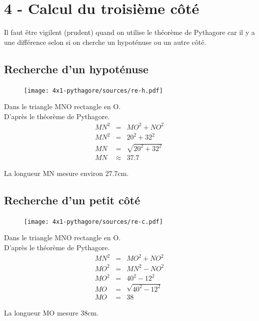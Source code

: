 \documentclass[12pt]{article}
\begin{document}
\newpage
\section*{4 - Calcul du troisième côté}

Il faut être vigilent (prudent) quand on utilise le théorème de Pythagore car il y a une différence selon si on cherche un hypoténuse ou un autre côté.

\begin{multicols}{2}

	\subsection*{Recherche d'un hypoténuse}

	\begin{figure}[H]
		\centering
		\texttt{[image: 4x1-pythagore/sources/re-h.pdf]}
	\end{figure}

	Dans le triangle MNO rectangle en O.\\
	D'après le théorème de Pythagore.
	\begin{eqnarray*}
		MN^2 &=& MO^2 + NO^2 \\
		MN^2 &=& 20^2 + 32^2 \\
		MN   &=& \sqrt{20^2 + 32^2} \\
		MN   &\approx& 37.7
	\end{eqnarray*}

	La longueur MN mesure environ 27.7cm.


\end{multicols}
\begin{multicols}{2}
	\subsection*{Recherche d'un petit côté}

	\begin{figure}[H]
		\centering
		\texttt{[image: 4x1-pythagore/sources/re-c.pdf]}
	\end{figure}

	Dans le triangle MNO rectangle en O.\\
	D'après le théorème de Pythagore.
	\begin{eqnarray*}
		MN^2 &=& MO^2 + NO^2 \\
		MO^2 &=& MN^2 - NO^2 \\
		MO^2 &=& 40^2 - 12^2 \\
		MO   &=& \sqrt{40^2 - 12^2} \\
		MO   &=& 38
	\end{eqnarray*}

	La longueur MO mesure 38cm.

\end{multicols}
\end{document}
